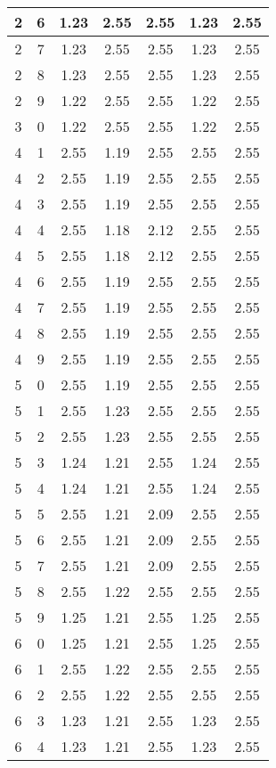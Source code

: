 \begin{longtable}{|c|c||c||c|c||c|c|}
	2 & 6 & 1.23 & 2.55 & 2.55 & 1.23 & 2.55 \\ \hline
	2 & 7 & 1.23 & 2.55 & 2.55 & 1.23 & 2.55 \\ \hline
	2 & 8 & 1.23 & 2.55 & 2.55 & 1.23 & 2.55 \\ \hline
	2 & 9 & 1.22 & 2.55 & 2.55 & 1.22 & 2.55 \\ \hline
	3 & 0 & 1.22 & 2.55 & 2.55 & 1.22 & 2.55 \\ \hline
	4 & 1 & 2.55 & 1.19 & 2.55 & 2.55 & 2.55 \\ \hline
	4 & 2 & 2.55 & 1.19 & 2.55 & 2.55 & 2.55 \\ \hline
	4 & 3 & 2.55 & 1.19 & 2.55 & 2.55 & 2.55 \\ \hline
	4 & 4 & 2.55 & 1.18 & 2.12 & 2.55 & 2.55 \\ \hline
	4 & 5 & 2.55 & 1.18 & 2.12 & 2.55 & 2.55 \\ \hline
	4 & 6 & 2.55 & 1.19 & 2.55 & 2.55 & 2.55 \\ \hline
	4 & 7 & 2.55 & 1.19 & 2.55 & 2.55 & 2.55 \\ \hline
	4 & 8 & 2.55 & 1.19 & 2.55 & 2.55 & 2.55 \\ \hline
	4 & 9 & 2.55 & 1.19 & 2.55 & 2.55 & 2.55 \\ \hline
	5 & 0 & 2.55 & 1.19 & 2.55 & 2.55 & 2.55 \\ \hline
	5 & 1 & 2.55 & 1.23 & 2.55 & 2.55 & 2.55 \\ \hline
	5 & 2 & 2.55 & 1.23 & 2.55 & 2.55 & 2.55 \\ \hline
	5 & 3 & 1.24 & 1.21 & 2.55 & 1.24 & 2.55 \\ \hline
	5 & 4 & 1.24 & 1.21 & 2.55 & 1.24 & 2.55 \\ \hline
	5 & 5 & 2.55 & 1.21 & 2.09 & 2.55 & 2.55 \\ \hline
	5 & 6 & 2.55 & 1.21 & 2.09 & 2.55 & 2.55 \\ \hline
	5 & 7 & 2.55 & 1.21 & 2.09 & 2.55 & 2.55 \\ \hline
	5 & 8 & 2.55 & 1.22 & 2.55 & 2.55 & 2.55 \\ \hline
	5 & 9 & 1.25 & 1.21 & 2.55 & 1.25 & 2.55 \\ \hline
	6 & 0 & 1.25 & 1.21 & 2.55 & 1.25 & 2.55 \\ \hline
	6 & 1 & 2.55 & 1.22 & 2.55 & 2.55 & 2.55 \\ \hline
	6 & 2 & 2.55 & 1.22 & 2.55 & 2.55 & 2.55 \\ \hline
	6 & 3 & 1.23 & 1.21 & 2.55 & 1.23 & 2.55 \\ \hline
	6 & 4 & 1.23 & 1.21 & 2.55 & 1.23 & 2.55 \\ \hline

\end{longtable}
